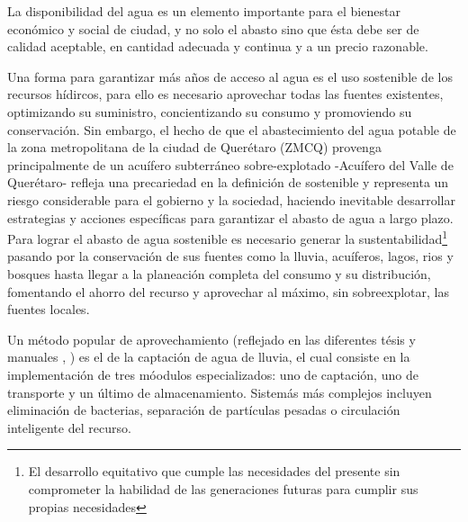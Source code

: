 \documentclass[letterpaper,12pt,oneside]{book}
\begin{document}
    La disponibilidad del agua es un elemento importante para el bienestar económico y social de ciudad, y no solo el abasto sino que ésta debe ser de calidad aceptable, en cantidad adecuada y continua y a un precio razonable.
    
    Una forma para garantizar más años de acceso al agua es el uso sostenible de los recursos hídircos, para ello es necesario aprovechar todas las fuentes existentes, optimizando su suministro, concientizando su consumo y promoviendo su conservación. Sin embargo, el hecho de que el abastecimiento del agua potable de la zona metropolitana de la ciudad de Querétaro (ZMCQ) provenga principalmente de un acuífero subterráneo sobre-explotado -Acuífero del Valle de Querétaro- refleja una precariedad en la definición de sostenible y representa un riesgo considerable para el gobierno y la sociedad, haciendo inevitable desarrollar estrategias y acciones específicas para garantizar el abasto de agua a largo plazo. Para lograr el abasto de agua sostenible es necesario generar la sustentabilidad\footnote{El desarrollo equitativo que cumple las necesidades del presente sin comprometer la habilidad de las generaciones futuras para cumplir sus propias necesidades} pasando por la conservación de sus fuentes como la lluvia, acuíferos, lagos, rios y bosques hasta llegar a la planeación completa del consumo y su distribución, fomentando el ahorro del recurso y aprovechar al máximo, sin sobreexplotar, las fuentes locales.

    Un método popular de aprovechamiento (reflejado en las diferentes tésis y manuales \cite{comision2016lineamientos} \cite{hugues2019captacion} \cite{nickisch2018sistemas} \cite{van2013captacion},\cite{queralt2011agua} \cite{unatsabar2004guia}) es el de la captación de agua de lluvia, el cual consiste en la implementación de tres móodulos especializados: uno de captación, uno de transporte y un último de almacenamiento. Sistemás más complejos incluyen  eliminación de bacterias, separación de partículas pesadas o circulación inteligente del recurso.
\end{document}
